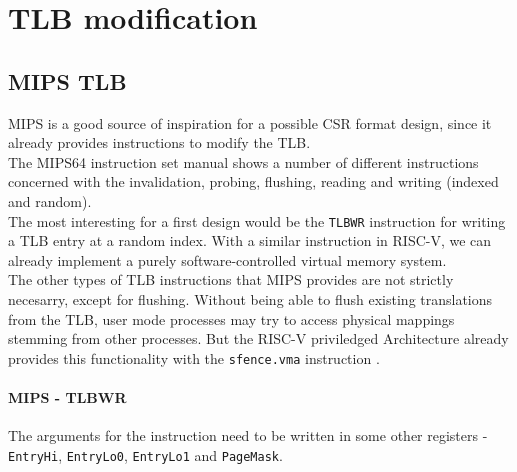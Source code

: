 \section{TLB modification}

\subsection{MIPS TLB} %

MIPS is a good source of inspiration for a possible CSR format design, since it already provides
instructions to modify the TLB.\\
The MIPS64 instruction set manual \cite{MIPSArchitectureProgrammers2016}
shows a number of different instructions concerned with the invalidation, probing, flushing, reading
and writing (indexed and random).\\
The most interesting for a first design would be the \texttt{TLBWR} instruction for writing a TLB
entry at a random index. With a similar instruction in RISC-V, we can already implement a purely
software-controlled virtual memory system.\\
The other types of TLB instructions that MIPS provides are not strictly necesarry,
except for flushing. Without being able to flush existing translations from the TLB,
user mode processes may try to access physical mappings stemming from other processes.
But the RISC-V priviledged Architecture already provides this functionality
with the \texttt{sfence.vma} instruction \cite{riscvreader}.

\paragraph{MIPS - TLBWR} The arguments for the instruction need to be written in some
other registers - \texttt{EntryHi}, \texttt{EntryLo0}, \texttt{EntryLo1} and \texttt{PageMask}.

